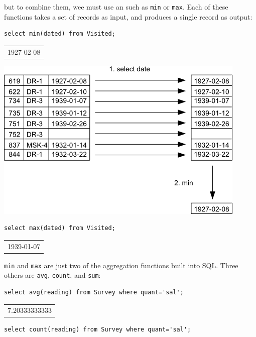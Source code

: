 \documentclass{book}
\begin{document}
but to combine them, wee must use an
 such as
\texttt{min} or \texttt{max}. Each of these functions takes a set of
records as input, and produces a single record as output:

\begin{verbatim}
select min(dated) from Visited;
\end{verbatim}

\begin{tabular}{l}
1927-02-08 \\
\end{tabular}

\includegraphics{novice/sql/img/sql-aggregation.png}

\begin{verbatim}
select max(dated) from Visited;
\end{verbatim}

\begin{tabular}{l}
1939-01-07 \\
\end{tabular}

\texttt{min} and \texttt{max} are just two of the aggregation functions
built into SQL. Three others are \texttt{avg}, \texttt{count}, and
\texttt{sum}:

\begin{verbatim}
select avg(reading) from Survey where quant='sal';
\end{verbatim}

\begin{tabular}{l}
7.20333333333 \\
\end{tabular}

\begin{verbatim}
select count(reading) from Survey where quant='sal';
\end{verbatim}
\end{document}
